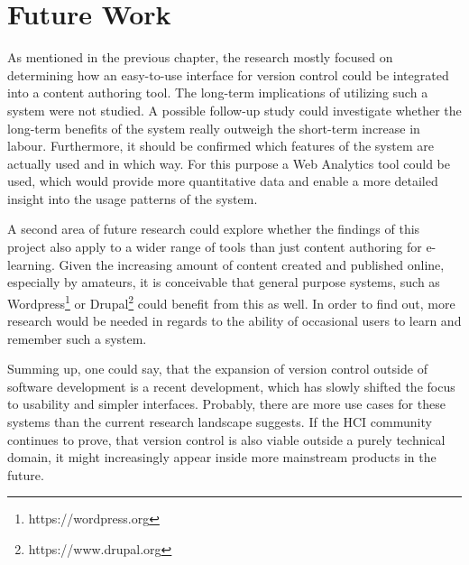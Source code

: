 \chapter{Future Work} \label{chapter:future-work}
As mentioned in the previous chapter, the research mostly focused on determining how an easy-to-use interface for version control could be integrated into a content authoring tool. The long-term implications of utilizing such a system were not studied. A possible follow-up study could investigate whether the long-term benefits of the system really outweigh the short-term increase in labour. Furthermore, it should be confirmed which features of the system are actually used and in which way. For this purpose a Web Analytics tool could be used, which would provide more quantitative data and enable a more detailed insight into the usage patterns of the system.

A second area of future research could explore whether the findings of this project also apply to a wider range of tools than just content authoring for e-learning. Given the increasing amount of content created and published online, especially by amateurs, it is conceivable that general purpose systems, such as Wordpress\footnote{https://wordpress.org} or Drupal\footnote{https://www.drupal.org} could benefit from this as well. In order to find out, more research would be needed in regards to the ability of occasional users to learn and remember such a system.

Summing up, one could say, that the expansion of version control outside of software development is a recent development, which has slowly shifted the focus to usability and simpler interfaces. Probably, there are more use cases for these systems than the current research landscape suggests. If the HCI community continues to prove, that version control is also viable outside a purely technical domain, it might increasingly appear inside more mainstream products in the future.










